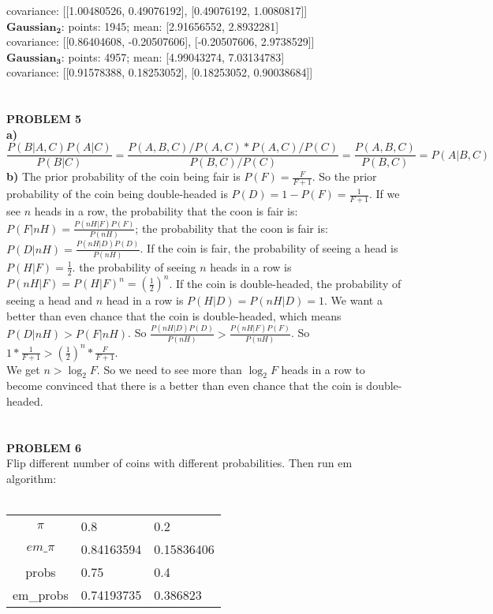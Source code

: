 \documentclass[11pt,a4paper,fleqn]{article}
\begin{document}
\indent covariance: [[1.00480526, 0.49076192], [0.49076192, 1.0080817]] \\
\indent $\mathbf{Gaussian_2}$: points: 1945; mean: [2.91656552, 2.8932281]\\
\indent covariance: [[0.86404608, -0.20507606], [-0.20507606, 2.9738529]] \\
\indent $\mathbf{Gaussian_3}$: points: 4957; mean: [4.99043274, 7.03134783]\\
\indent covariance: [[0.91578388, 0.18253052], [0.18253052, 0.90038684]] \\
\\
\\
\textbf{PROBLEM 5}\\
\textbf{a)}
$$\frac{P(B|A,C)P(A|C)}{P(B|C)}=\frac{P(A,B,C)/P(A,C)*P(A,C)/P(C)}{P(B,C)/P(C)}=\frac{P(A,B,C)}{P(B,C)}=P(A|B,C)$$
\textbf{b)}
The prior probability of the coin being fair is $P(F)=\frac{F}{F+1}$. So the prior probability of the coin being double-headed is $P(D) = 1 - P(F) = \frac{1}{F+1}$. If we see $n$ heads in a row, the probability that the coon is fair is: $P(F|nH) = \frac{P(nH|F)P(F)}{P(nH)}$;  the probability that the coon is fair is: $P(D|nH) = \frac{P(nH|D)P(D)}{P(nH)}$. If the coin is fair, the probability of seeing a head is $P(H|F) = \frac{1}{2}$. the probability of seeing $n$ heads in a row is $P(nH|F) = P(H|F)^n = (\frac{1}{2})^n$. If the coin is double-headed, the probability of seeing a head and $n$ head in a row is $P(H|D)=P(nH|D)=1$. We want a better than even chance that the coin is double-headed, which means $P(D|nH)>P(F|nH)$. So $\frac{P(nH|D)P(D)}{P(nH)}>\frac{P(nH|F)P(F)}{P(nH)}$. So $1*\frac{1}{F+1}>(\frac{1}{2})^n*\frac{F}{F+1}$.\\
We get $n > \log_2F$. So we need to see more than  $\log_2F$ heads in a row to become convinced that there is a better than even chance that the coin is double-headed.\\
\\
\\
\textbf{PROBLEM 6}\\
Flip different number of coins with different probabilities. Then run em algorithm:\\ \\
\begin{tabular}{|c|ll|}
\hline
$\pi$&0.8&0.2\\
$em\_\pi$&0.84163594&0.15836406\\
\hline
probs&0.75&0.4\\
em\_probs&0.74193735&0.386823\\
\hline
\end{tabular}\\ \\ \\
\end{document}
